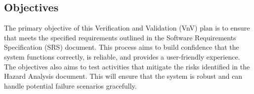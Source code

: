 \documentclass[12pt, titlepage]{article}
\begin{document}
\subsection{Objectives}




The primary objective of this Verification and Validation (VnV) plan is to
ensure that \progname{} meets the specified requirements outlined in the Software
Requirements Specification (SRS) document. This process aims to build confidence
that the system functions correctly, is reliable, and provides a user-friendly
experience. The objectives also aims to test activities that mitigate the risks
identified in the Hazard Analysis document. This will ensure that the system is
robust and can handle potential failure scenarios gracefully.

\vspace{1em}
\end{document}
